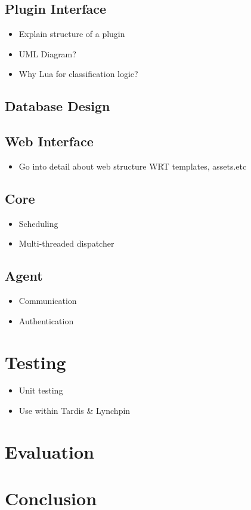 \documentclass[bsc,logo,twoside]{infthesis}
\begin{document}
\section{Plugin Interface}
\begin{itemize}
	\item Explain structure of a plugin
	\item UML Diagram?
	\item Why Lua for classification logic?
\end{itemize}

\section{Database Design}

\section{Web Interface}
\begin{itemize}
	\item Go into detail about web structure WRT templates, assets.etc
\end{itemize}

\section{Core}
\begin{itemize}
	\item Scheduling
	\item Multi-threaded dispatcher
\end{itemize}

\section{Agent}
\begin{itemize}
	\item Communication
	\item Authentication
\end{itemize}

\chapter{Testing}
\begin{itemize}
	\item Unit testing
	\item Use within Tardis \& Lynchpin
\end{itemize}
	
\chapter{Evaluation}

\chapter{Conclusion}
\end{document}
